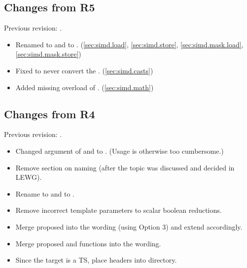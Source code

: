 \subsection{Changes from R5}
Previous revision: \parencite{P0214R5}.
\begin{itemize}
  \item Renamed  to  and  to . (\ref{sec:simd.load}, \ref{sec:simd.store}, \ref{sec:simd.mask.load}, \ref{sec:simd.mask.store})
  \item Fixed  to never convert the . (\ref{sec:simd.casts})
  \item Added missing  overload of . (\ref{sec:simd.math})
\end{itemize}

\subsection{Changes from R4}
Previous revision: \parencite{P0214R4}.
\begin{itemize}
  \item Changed  argument of  and  to .
    (Usage is otherwise too cumbersome.)
  \item Remove section on naming (after the topic was discussed and decided in LEWG).
  \item Rename  to  and  to .
  \item Remove incorrect template parameters to scalar boolean reductions.
  \item Merge proposed  into the wording (using Option 3) and extend  accordingly.
  \item Merge proposed  and  functions into the wording.
  \item Since the target is a TS, place headers into  directory.
\end{itemize}

